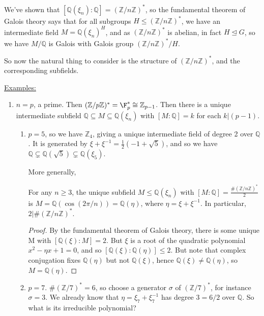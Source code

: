 \documentclass[a4paper, 10pt, twocolumn]{amsart}
\begin{document}
We've shown that $[\mathbb{Q}(\xi_n):\mathbb{Q}] = (\mathbb{Z}/n\mathbb{Z})^{\ast}$, so the fundamental theorem of Galois theory says that for all subgroups $H \leq (\mathbb{Z}/n\mathbb{Z})^{\ast}$, we have an intermediate field $M = \mathbb{Q}(\xi_n)^H$, and as $(\mathbb{Z}/n\mathbb{Z})^{\ast}$ is abelian, in fact $H \trianglelefteq G$, so we have $M/\mathbb{Q}$ is Galois with Galois group $(\mathbb{Z}/n\mathbb{Z})^{\ast}/H$.

So now the natural thing to consider is the structure of $(\mathbb{Z}/n\mathbb{Z})^{\ast}$, and the corresponding subfields.

\underline{Examples:}
\begin{enumerate}
\item $n=p$, a prime. Then $(\mathbb{Z}/p\mathbb{Z})^{\ast} = \F_p^{\ast} \cong \mathbb{Z}_{p-1}$. Then there is a unique intermediate subfield $\mathbb{Q} \subseteq M \subseteq \mathbb{Q}(\xi_n)$ with $[M:\mathbb{Q}] = k$ for each $k|(p-1)$.
\begin{enumerate}
\item $p=5$, so we have $\mathbb{Z}_4$, giving a unique intermediate field of degree 2 over $\mathbb{Q}$. It is generated by $\xi+\xi^{-1} = \frac{1}{2}(-1+\sqrt{5})$, and so we have $\mathbb{Q} \subsetneq \mathbb{Q}(\sqrt{5})\subsetneq \mathbb{Q}(\xi_5)$.

More generally,
\begin{lemma}
For any $n \geq 3$, the unique subfield $M \leq \mathbb{Q}(\xi_n)$ with $[M:\mathbb{Q}] = \frac{\#(\mathbb{Z}/n\mathbb{Z})^{\ast}}{2}$ is $M = \mathbb{Q}(\cos(2\pi/n)) = \mathbb{Q}(\eta)$, where $\eta  = \xi+\xi^{-1}$. In particular, $2 | \#(\mathbb{Z}/n\mathbb{Z})^{\ast}$.
\end{lemma}
\begin{proof}
By the fundamental theorem of Galois theory, there is some unique M with $[\mathbb{Q}(\xi):M] = 2$. But $\xi$ is a root of the quadratic polynomial $x^2-\eta x+1 = 0$, and so $[\mathbb{Q}(\xi):\mathbb{Q}(\eta)] \leq 2$. But note that complex conjugation fixes $\mathbb{Q}(\eta)$ but not $\mathbb{Q}(\xi)$, hence $\mathbb{Q}(\xi)\neq \mathbb{Q}(\eta)$, so $M = \mathbb{Q}(\eta)$.
\end{proof}
\item $p=7$. $\#(\mathbb{Z}/7)^{\ast} = 6$, so choose a generator $\sigma$ of $(\mathbb{Z}/7)^{\ast}$, for instance $\sigma = 3$. We already know that $\eta = \xi_7+\xi_7^{-1}$ has degree $3=6/2$ over $\mathbb{Q}$. So what is its irreducible polynomial?


\end{enumerate}
\end{enumerate}
\end{document}
